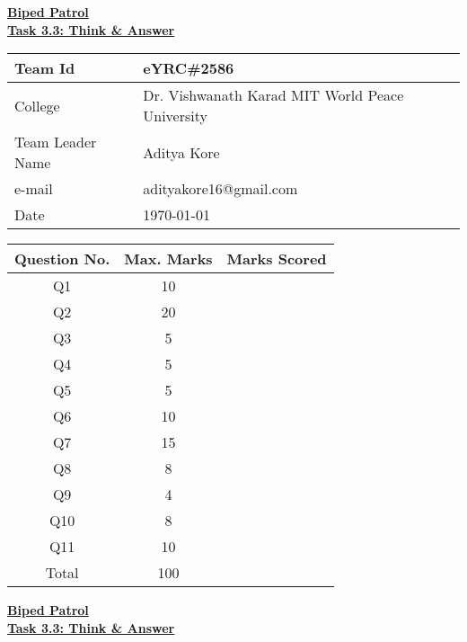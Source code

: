 \documentclass[a4paper,12pt]{article}
\author{eYRC\#2586} %
\date{\normalsize\today} %
\begin{document}
\begin{center}
	\bf \Huge \underline{\textbf{Biped Patrol}} \\
	\vspace{5mm}
	\Large \underline {\textbf{Task 3.3: Think \& Answer}}\\
\end{center}
\vspace{5mm}
\begin{center}
	\begin{tabular}{|p{5cm}|p{10cm}|}
		\hline
		Team Id & eYRC\#2586 \\
		\hline
		College &  Dr. Vishwanath Karad MIT World Peace University \\
		\hline
		Team Leader Name & Aditya Kore \\
		\hline
		e-mail & adityakore16@gmail.com \\
		\hline
		Date & \today \\
		\hline
	\end{tabular}
\end{center}
\vspace{25mm}
\begin{center}
	\begin{tabular}{|c|c|c|}
		\hline
		Question No. & Max. Marks & Marks Scored \\
		\hline
		Q1 &  10 & \\
		\hline
		Q2 &  20 & \\
		\hline
		Q3 &  5 & \\
		\hline
		Q4 &  5 & \\
		\hline
		Q5 &  5 & \\
		\hline
		Q6 &  10 & \\
		\hline
		Q7 &  15 & \\
		\hline
		Q8 &  8 & \\
		\hline
		Q9 &  4 & \\
		\hline
		Q10 &  8 & \\
		\hline
		Q11 &  10 & \\
		\hline
		Total &  100 & \\
		\hline
	\end{tabular}
\end{center}
\newpage 
\begin{center}
\bf \Huge \underline{\textbf{Biped Patrol}} \\
\vspace{5mm}
\Large \underline {\textbf{Task 3.3: Think \& Answer}}\\
\end{center}
\vspace{1cm}
\end{document}

